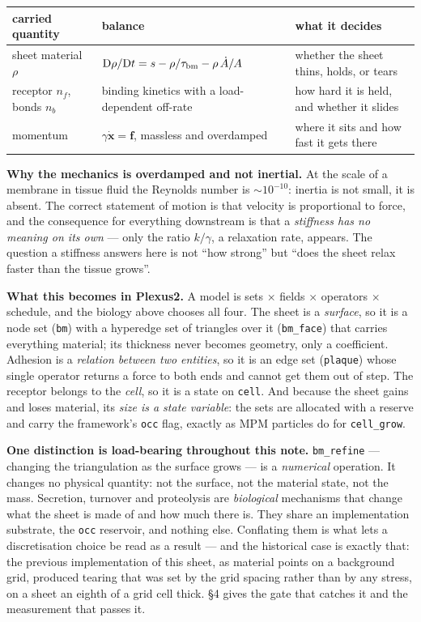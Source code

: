 \documentclass[10pt,a4paper]{article}
\newcommand{\code}[1]{\texttt{#1}}
\newcommand{\op}[1]{\texttt{#1}}
\begin{document}
\begin{center}\small
\begin{tabular}{@{}lll@{}}\toprule
carried quantity & balance & what it decides\\\midrule
sheet material $\rho$ & $\mathrm D\rho/\mathrm Dt = s-\rho/\tau_{\rm bm}-\rho\,\dot A/A$ &
  whether the sheet thins, holds, or tears\\
receptor $n_f$, bonds $n_b$ & binding kinetics with a load-dependent off-rate &
  how hard it is held, and whether it slides\\
momentum & $\gamma\dot{\mathbf x}=\mathbf f$, massless and overdamped &
  where it sits and how fast it gets there\\
\bottomrule
\end{tabular}
\end{center}

\textbf{Why the mechanics is overdamped and not inertial.} At the scale of a membrane in tissue fluid
the Reynolds number is $\sim\!10^{-10}$: inertia is not small, it is absent. The correct statement of
motion is that velocity is proportional to force, and the consequence for everything downstream is
that a \emph{stiffness has no meaning on its own} --- only the ratio $k/\gamma$, a relaxation rate,
appears. The question a stiffness answers here is not ``how strong'' but ``does the sheet relax faster
than the tissue grows''.

\textbf{What this becomes in Plexus2.} A model is sets $\times$ fields $\times$ operators $\times$
schedule, and the biology above chooses all four. The sheet is a \emph{surface}, so it is a node set
(\code{bm}) with a hyperedge set of triangles over it (\code{bm\_face}) that carries everything
material; its thickness never becomes geometry, only a coefficient. Adhesion is a \emph{relation
between two entities}, so it is an edge set (\code{plaque}) whose single operator returns a force to
both ends and cannot get them out of step. The receptor belongs to the \emph{cell}, so it is a state
on \code{cell}. And because the sheet gains and loses material, its \emph{size is a state variable}:
the sets are allocated with a reserve and carry the framework's \code{occ} flag, exactly as MPM
particles do for \op{cell\_grow}.

\textbf{One distinction is load-bearing throughout this note.} \op{bm\_refine} --- changing the
triangulation as the surface grows --- is a \emph{numerical} operation. It changes no physical
quantity: not the surface, not the material state, not the mass. Secretion, turnover and proteolysis
are \emph{biological} mechanisms that change what the sheet is made of and how much there is. They
share an implementation substrate, the \code{occ} reservoir, and nothing else. Conflating them is what
lets a discretisation choice be read as a result --- and the historical case is exactly that: the
previous implementation of this sheet, as material points on a background grid, produced tearing that
was set by the grid spacing rather than by any stress, on a sheet an eighth of a grid cell thick. \S4
gives the gate that catches it and the measurement that passes it.
\end{document}
